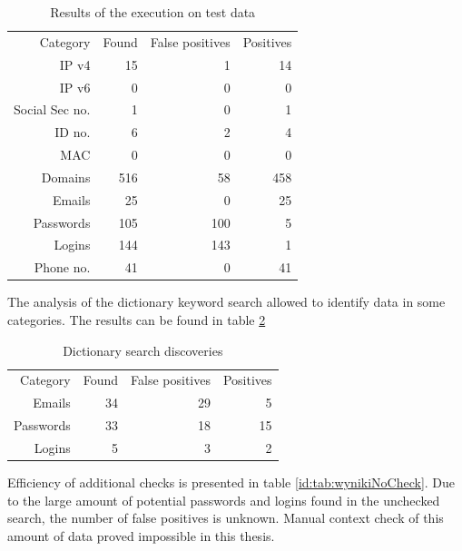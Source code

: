 \documentclass[a4paper,twoside,12pt]{book}
\begin{document}
\begin{table}
   \centering
   \caption{Results of the execution on test data}
   \label{id:tab:wyniki}
   \begin{tabular}{rrrr}
   \toprule
      Category       &   Found &   False positives & Positives \\
      IP v4          &      15 &                 1 &        14 \\
      IP v6          &       0 &                 0 &         0 \\
      Social Sec no. &       1 &                 0 &         1 \\
      ID no.         &       6 &                 2 &         4 \\
      MAC            &       0 &                 0 &         0 \\
      Domains        &     516 &                58 &       458 \\
      Emails         &      25 &                 0 &        25 \\
      Passwords      &     105 &               100 &         5 \\
      Logins         &     144 &               143 &         1 \\
      Phone no.      &      41 &                 0 &        41 \\
   \bottomrule
   \end{tabular}
   \end{table}  

The analysis of the dictionary keyword search allowed to identify data in some categories. The results can be found in table \ref{id:tab:wynikiDictionary}

\begin{table}
   \centering
   \caption{Dictionary search discoveries}
   \label{id:tab:wynikiDictionary}
   \begin{tabular}{rrrr}
   \toprule
      Category       &   Found &    False positives & Positives \\
      Emails         &      34 &                 29 &         5 \\
      Passwords      &      33 &                 18 &        15 \\
      Logins         &       5 &                  3 &         2 \\
   \bottomrule
   \end{tabular}
   \end{table} 

Efficiency of additional checks is presented in table \ref{id:tab:wynikiNoCheck}. Due to the large amount of potential passwords and logins
found in the unchecked search, the number of false positives is unknown. Manual context check of this amount of data proved impossible in this 
thesis.
\end{document}
